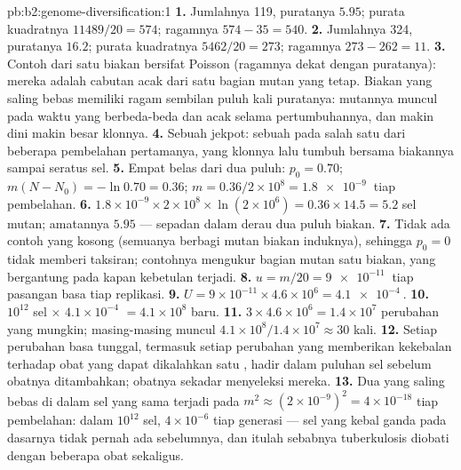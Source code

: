 \begin{solution}{pb:b2:genome-diversification:1}
\textbf{1.} Jumlahnya 119, puratanya $5.95$; purata kuadratnya
$11489/20 = 574$; ragamnya $574 - 35 = 540$.
\textbf{2.} Jumlahnya 324, puratanya $16.2$; purata kuadratnya
$5462/20 = 273$; ragamnya $273 - 262 = 11$.
\textbf{3.} Contoh dari satu biakan bersifat Poisson (ragamnya dekat
dengan puratanya): mereka adalah cabutan acak dari satu bagian mutan
yang tetap. Biakan yang saling bebas memiliki ragam sembilan puluh kali
puratanya: mutannya muncul pada waktu yang berbeda-beda dan acak selama
pertumbuhannya, dan makin dini  makin besar klonnya.
\textbf{4.} Sebuah jekpot: sebuah  pada salah satu dari beberapa
pembelahan pertamanya, yang klonnya lalu tumbuh bersama biakannya
sampai seratus sel.
\textbf{5.} Empat belas dari dua puluh: $p_0 = 0.70$; $m(N - N_0) = -\ln 0.70
= 0.36$; $m = 0.36/2\times 10^{8} = \qty{1.8e-9}{}$ tiap pembelahan.
\textbf{6.} $1.8\times 10^{-9}\times 2\times 10^{8}\times \ln(2\times
10^{6}) = 0.36\times 14.5 = 5.2$ sel mutan; amatannya $5.95$ ---
sepadan dalam derau dua puluh biakan.
\textbf{7.} Tidak ada contoh yang kosong (semuanya berbagi mutan biakan
induknya), sehingga $p_0 = 0$ tidak memberi taksiran; contohnya
mengukur bagian mutan satu biakan, yang bergantung pada kapan 
kebetulan terjadi.
\textbf{8.} $u = m/20 = \qty{9e-11}{}$ tiap pasangan basa tiap replikasi.
\textbf{9.} $U = 9\times 10^{-11}\times 4.6\times 10^{6} =
\qty{4.1e-4}{}$.
\textbf{10.} $10^{12}$ sel $\times$ $4.1\times 10^{-4}$ $= 4.1\times
10^{8}$  baru.
\textbf{11.} $3\times 4.6\times 10^{6} = 1.4\times 10^{7}$ perubahan
yang mungkin; masing-masing muncul
$4.1\times 10^{8}/1.4\times 10^{7} \approx 30$ kali.
\textbf{12.} Setiap perubahan basa tunggal, termasuk setiap perubahan
yang memberikan kekebalan terhadap obat yang dapat dikalahkan satu
, hadir dalam puluhan sel sebelum obatnya ditambahkan; obatnya
sekadar menyeleksi mereka.
\textbf{13.} Dua  yang saling bebas di dalam sel yang sama
terjadi pada $m^2 \approx (2\times 10^{-9})^2 = 4\times 10^{-18}$ tiap
pembelahan: dalam $10^{12}$ sel, $4\times 10^{-6}$ tiap generasi ---
sel yang kebal ganda pada dasarnya tidak pernah ada sebelumnya, dan
itulah sebabnya tuberkulosis diobati dengan beberapa obat sekaligus.

\end{solution}
